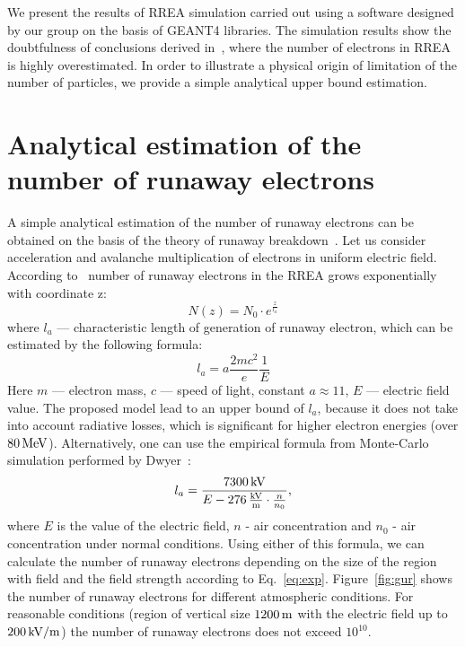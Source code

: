 \documentclass[doublecol,linenumbers]{epl2} %
\begin{document}
	We present the results of RREA simulation carried out using a software designed by our group on the basis of GEANT4 libraries. The simulation results show the doubtfulness of conclusions derived in~\cite{Oreshkin_2018}, where the number of electrons in RREA is highly overestimated. In order to illustrate a physical origin of limitation of the number of particles, we provide a simple analytical upper bound estimation.
	
	\section{Analytical estimation of the number of runaway electrons}
	
	A simple analytical estimation of the number of runaway electrons can be obtained on the basis of the theory of runaway breakdown~\cite{Gurevich:2001}. Let us consider acceleration and avalanche multiplication of electrons in uniform electric field. According to~\cite{Gurevich:2001} number of runaway electrons in the RREA grows exponentially with coordinate z:
	\begin{equation}
		\label{eq:exp}
		N(z) = N_0 \cdot e^{\frac{z}{l_a}}
	\end{equation}
	where $l_a$ --- characteristic length of generation of runaway electron, which can be estimated by the following formula:
	\begin{equation}
		l_a = a\frac{2 m c^{2}}{e} \frac{1}{E}
	\end{equation}
	Here $m$ --- electron mass, $c$ --- speed of light, constant $a \approx 11$, $E$ --- electric field value. The proposed model lead to an upper bound of $l_a$, because it does not take into account radiative losses, which is significant for higher electron energies (over $80~\un{MeV}$).
	Alternatively, one can use the empirical formula from Monte-Carlo simulation performed by Dwyer~\cite{Dwyer2007}:
	\begin{equation}
		\label{eq:dwyer}
		l_a = \frac{7300\un{kV}}{E - 276\un{ \frac{kV}{m}} \cdot \frac{n}{n_0}},
	\end{equation}
	where $E$ is the value of the electric field, $n$ - air concentration and $n_0$ - air concentration under normal conditions. Using either of this formula, we can calculate the number of runaway electrons depending on the size of the region with field and the field strength according to Eq.~\ref{eq:exp}. 
	Figure~\ref{fig:gur} shows the number of runaway electrons for different atmospheric conditions. For reasonable conditions  (region of vertical size $1200\un{m}$ with the electric field up to $200\un{kV/m}$) the number of runaway electrons does not exceed $10^{10}$.
\end{document}
